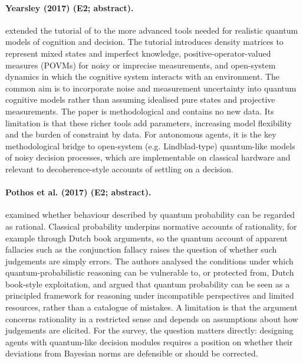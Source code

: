 \documentclass[10pt,a4paper]{article}
\begin{document}
\paragraph{Yearsley (2017) (E2; abstract).} \citet{Yearsley2017} extended the tutorial of \citep{Yearsley2016a} to the more advanced tools needed for realistic quantum models of cognition and decision. The tutorial introduces density matrices to represent mixed states and imperfect knowledge, positive-operator-valued measures (POVMs) for noisy or imprecise measurements, and open-system dynamics in which the cognitive system interacts with an environment. The common aim is to incorporate noise and measurement uncertainty into quantum cognitive models rather than assuming idealised pure states and projective measurements. The paper is methodological and contains no new data. Its limitation is that these richer tools add parameters, increasing model flexibility and the burden of constraint by data. For autonomous agents, it is the key methodological bridge to open-system (e.g. Lindblad-type) quantum-like models of noisy decision processes, which are implementable on classical hardware and relevant to decoherence-style accounts of settling on a decision.

\paragraph{Pothos et al. (2017) (E2; abstract).} \citet{Pothos2017} examined whether behaviour described by quantum probability can be regarded as rational. Classical probability underpins normative accounts of rationality, for example through Dutch book arguments, so the quantum account of apparent fallacies such as the conjunction fallacy raises the question of whether such judgements are simply errors. The authors analysed the conditions under which quantum-probabilistic reasoning can be vulnerable to, or protected from, Dutch book-style exploitation, and argued that quantum probability can be seen as a principled framework for reasoning under incompatible perspectives and limited resources, rather than a catalogue of mistakes. A limitation is that the argument concerns rationality in a restricted sense and depends on assumptions about how judgements are elicited. For the survey, the question matters directly: designing agents with quantum-like decision modules requires a position on whether their deviations from Bayesian norms are defensible or should be corrected.
\end{document}
